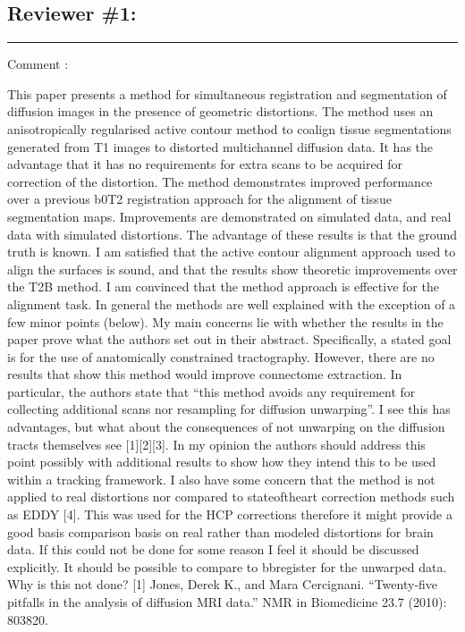 \documentclass[9pt]{memoir}
\newcounter{reviewpoint}
\newenvironment{reviewpoint}%
{\refstepcounter{reviewpoint}\par\medskip\vspace{3ex}\hrule\vspace{1.5ex}\par\noindent%
   {\fontseries{b}\selectfont Comment \arabic{reviewpoint}:}
   \begingroup%
   \color{black!60}
   \fontshape{it}\selectfont %

}
{\endgroup\label{com:\thereviewpoint}\par\medskip}
\begin{document}
\subsection*{Reviewer \#1:}
\begin{reviewpoint}
This paper presents a method for simultaneous registration and segmentation of diffusion images in the presence of geometric distortions. The method uses an anisotropically regularised active contour method to co­align tissue segmentations generated from T1 images to distorted multi­channel diffusion data. It has the advantage that it has no requirements for extra scans to be acquired for correction of the distortion. The method demonstrates improved performance over a previous b0­T2 registration approach for the alignment of tissue segmentation maps. Improvements are demonstrated on simulated data, and real data with simulated distortions. The advantage of these results is that the ground truth is known.
I am satisfied that the active contour alignment approach used to align the surfaces is sound, and that the results show theoretic improvements over the T2B method. I am convinced that the method approach is effective for the alignment task. In general the methods are well explained with the exception of a few minor points (below).
My main concerns lie with whether the results in the paper prove what the authors set out in their abstract. Specifically, a stated goal is for the use of anatomically constrained tractography. However, there are no results that show this method would improve connectome extraction. In particular, the authors state that ``this method avoids any requirement for collecting additional scans nor resampling for diffusion unwarping''. I see this has advantages, but what about the consequences of not unwarping on the diffusion tracts themselves see [1][2][3]. In my opinion the authors should address this point possibly with additional results to show how they intend this to be used within a tracking framework.
I also have some concern that the method is not applied to real distortions nor compared to state­of­the­art correction methods such as EDDY [4]. This was used for the HCP corrections therefore it might provide a good basis comparison basis on real rather than modeled distortions for brain data. If this could not be done for some reason I feel it should be discussed explicitly. It should be possible to compare to bbregister for the unwarped data. Why is this not done?
[1] Jones, Derek K., and Mara Cercignani. ``Twenty‐five pitfalls in the analysis of diffusion MRI data.'' NMR in Biomedicine 23.7 (2010): 803­820.

\end{reviewpoint}
\end{document}

